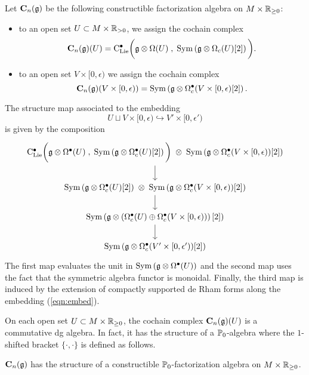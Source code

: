 \documentclass[11pt]{amsart}
\numberwithin{equation}{section}
\begin{document}
\begin{dfn}
\label{dfn:constructible1}
Let $\mathbf C_n(\mathfrak g)$ be the following constructible factorization algebra on $M \times \mathbb R_{\geq 0}$:
\begin{itemize}
\item to an open set $U \subset M \times \mathbb R_{> 0}$, we assign the cochain complex 
\[
\mathbf C_n (\mathfrak g) (U) = {\rm C}_{\rm Lie}^\bullet \bigg(\mathfrak g \otimes \Omega (U) \; , \; {\rm Sym} \left(\mathfrak g \otimes \Omega_c(U) [2] \right) \bigg) .
\]
\item to an open set $V \times [0,\epsilon)$ we assign the cochain complex 
\[
\mathbf C_n (\mathfrak g) (V \times [0,\epsilon)) = {\rm Sym} \left(\mathfrak g \otimes \Omega^\bullet_c (V \times [0,\epsilon) [2] \right).
\]
\end{itemize}
The structure map associated to the embedding 
\begin{equation}\label{eqn:embed}
U \sqcup V \times [0, \epsilon) \hookrightarrow V' \times [0,\epsilon')
\end{equation}
is given by the composition
\[
\begin{tikzcd}
\clies \bigg(\fg \otimes \Omega^\bu (U) \; , \; \Sym \left(\fg \otimes \Omega^\bu_c(U) [2] \right) \bigg) \; \otimes \;  {\rm Sym} \left(\fg \otimes \Omega^\bu_c (V\times [0,\epsilon)) [2] \right) \ar[d] \\
\Sym \left(\fg \otimes \Omega^\bu_c(U) [2] \right) \; \otimes \; \Sym \left(\fg \otimes \Omega^\bu_c (V \times [0,\epsilon)) [2] \right) \ar[d] \\
\Sym\left(\fg \otimes \left(\Omega^\bu_c(U) \oplus \Omega^\bu_c(V \times [0,\epsilon)) \right) [2] \right) \ar[d]\\
\Sym \left( \fg \otimes \Omega^\bu_c(V' \times [0,\epsilon')) [2] \right)
\end{tikzcd}
\]
The first map evaluates the unit in ${\rm Sym}\left(\mathfrak g \otimes \Omega^\bullet(U)\right)$ and the second map uses the fact that the symmetric algebra functor is monoidal. 
Finally, the third map is induced by the extension of compactly supported de Rham forms along the embedding (\ref{eqn:embed}). 
\end{dfn}

On each open set $U \subset M \times \mathbb R_{\geq 0}$, the cochain complex $\mathbf C_n(\mathfrak g) (U)$ is a commutative dg algebra. 
In fact, it has the structure of a $\mathbb P_0$-algebra where the $1$-shifted bracket $\{\cdot, \cdot\}$ is defined as follows.

\begin{lmm}
$\mathbf C_n(\mathfrak g)$ has the structure of a constructible $\mathbb P_0$-factorization algebra on $M \times \mathbb R_{\geq 0}$. 
\end{lmm}
\end{document}
